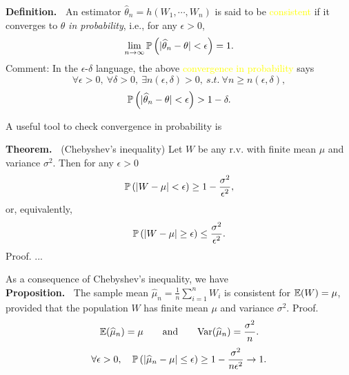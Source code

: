 \begin{frame}

 {\bf Definition.~} An estimator $\widehat\theta_n = h(W_1,\cdots,W_n)$ is said
 to be \textcolor{yellow}{consistent} if it converges to $\theta$ {\it in probability}, i.e.,
 for any $\epsilon>0$, \[
		 \lim_{n\rightarrow\infty}\mathbb{P}\left(|\widehat\theta_n-\theta|<\epsilon\right)=1.
		 \] \vfill \pause Comment: In the $\epsilon$-$\delta$ language, the above
		 \textcolor{yellow}{convergence in probability} says \[ \forall \epsilon>0,\: \forall
				 \delta>0,\:  \exists n(\epsilon,\delta)>0, \: s.t. \: \forall n\ge
				 n(\epsilon,\delta), \] \[
		 \mathbb{P}\left(|\widehat\theta_n-\theta|<\epsilon\right)>1-\delta.  \]
\end{frame}
\begin{frame}
 A useful tool to check convergence in probability is
 \vfill

 {\bf Theorem.~} (Chebyshev's inequality) Let $W$ be any r.v. with finite mean $\mu$ and variance $\sigma^2$. Then for any $\epsilon>0$
 \[
 \mathbb{P}\left(|W-\mu|<\epsilon\right)\ge 1-\frac{\sigma^2}{\epsilon^2},
 \]
 or, equivalently,
 \[
 \mathbb{P}\left(|W-\mu|\ge \epsilon\right)\le \frac{\sigma^2}{\epsilon^2}.
 \]
 \vfill
 {Proof.} ... \myEnd
\end{frame}
 \begin{frame}
 As a consequence of Chebyshev's inequality, we have \\
 \vfill
 {\bf Proposition.~} The sample mean $\widehat\mu_n =\frac{1}{n}\sum_{i=1}^n W_i$ is consistent for $\mathbb{E}(W)=\mu$, provided that the population $W$ has finite mean $\mu$ and variance $\sigma^2$.
 \vfill
 Proof.~
 \[
 \mathbb{E}(\widehat \mu_n) = \mu \qquad \text{and} \qquad \text{Var}(\widehat\mu_n)= \frac{\sigma^2}{n}.
 \]
 \[
 \forall \epsilon>0,\quad
 \mathbb{P}\left(|\widehat\mu_n-\mu|\le \epsilon\right)\ge 1-\frac{\sigma^2}{n\epsilon^2}  \rightarrow 1.
 \]
 \myEnd
 \end{frame}
